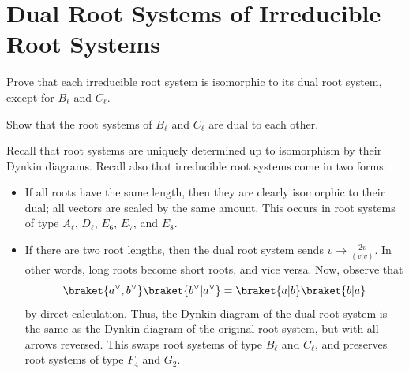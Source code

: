 \documentclass[11pt, headheight=30pt]{scrartcl}
\begin{document}

\section{Dual Root Systems of Irreducible Root Systems}
\begin{prob}
    Prove that each irreducible root system is isomorphic to its
    dual root system, except for $B_\ell$ and $C_\ell$.

    Show that the root systems of $B_\ell$ and $C_\ell$ are dual to each other.
\end{prob}

Recall that root systems are uniquely determined up to isomorphism
by their Dynkin diagrams. Recall also that irreducible root systems
come in two forms:
\begin{itemize}
    \item If all roots have the same length, then they are clearly
    isomorphic to their dual; all vectors are scaled by the same amount.
    This occurs in root systems
    of type $A_\ell$, $D_\ell$, $E_6$, $E_7$, and $E_8$.
    \item If there are two root lengths, then the dual root system
    sends $v\to \frac{2v}{(v | v)}$. In other words, long roots become
    short roots, and vice versa. Now, observe that
    \[
        \braket{a^\vee, b^\vee}\braket{b^\vee | a^\vee} = \braket{a | b}\braket{b | a}    
    \]
    by direct calculation. Thus, the Dynkin diagram of the dual root system
    is the same as the Dynkin diagram of the original root system, but with
    all arrows reversed. This swaps root systems of type $B_\ell$ and $C_\ell$,
    and preserves root systems of type $F_4$ and $G_2$.
\end{itemize}





\end{document}
